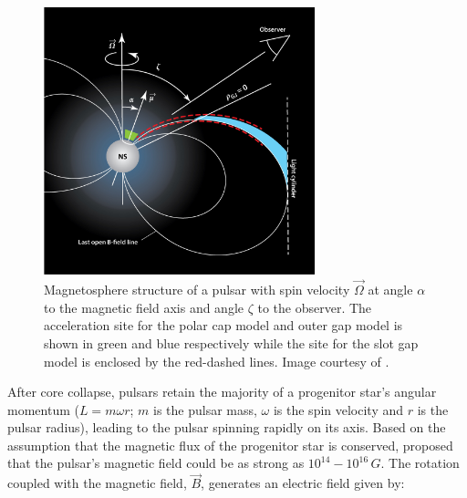\begin{figure}[b!]
	\centering
	\includegraphics[width=0.7\textwidth]{04_Introduction/Images/pulsar_wind_nebula/pulsar.jpeg}
	\caption{Magnetosphere structure of a pulsar with spin velocity $\vec{\Omega}$ at angle $\alpha$ to the magnetic field axis and angle $\zeta$ to the observer. The acceleration site for the polar cap model and outer gap model is shown in green and blue respectively while the site for the slot gap model is enclosed by the red-dashed lines. Image courtesy of \cite{2014ARA&A..52..211C}.}
	\label{fig:chapter1_magnetosphere_structure}
\end{figure}
\newpar
After core collapse, pulsars retain the majority of a progenitor star's angular momentum ($L=m\omega r$; $m$ is the pulsar mass, $\omega$ is the spin velocity and $r$ is the pulsar radius), leading to the pulsar spinning rapidly on its axis. Based on the assumption that the magnetic flux of the progenitor star is conserved, \cite{1964ApJ...140.1309W} proposed that the pulsar's magnetic field could be as strong as $10^{14}-10^{16}\,\si{G}$. The rotation coupled with the magnetic field, $\vec{B}$, generates an electric field given by:

